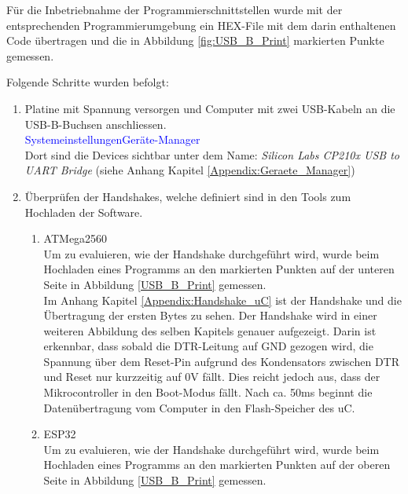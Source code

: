 
Für die Inbetriebnahme der Programmierschnittstellen wurde mit der entsprechenden Programmierumgebung ein HEX-File mit dem darin enthaltenen Code übertragen und die in Abbildung \ref{fig:USB_B_Print} markierten Punkte gemessen.

Folgende Schritte wurden befolgt:

\begin{enumerate}
\item Platine mit Spannung versorgen und Computer mit zwei USB-Kabeln an die USB-B-Buchsen anschliessen.\\
\textcolor{blue}{Systemeinstellungen\textrightarrow Geräte-Manager}\\
Dort sind die Devices sichtbar unter dem Name: \textit{Silicon Labs CP210x USB to UART Bridge} (siehe Anhang Kapitel \ref{Appendix:Geraete_Manager})\newline
\item Überprüfen der Handshakes, welche definiert sind in den Tools zum Hochladen der Software.\\

\begin{enumerate}
\item ATMega2560\\

Um zu evaluieren, wie der Handshake durchgeführt wird, wurde beim Hochladen eines Programms an den markierten Punkten auf der unteren Seite in Abbildung \ref{USB_B_Print} gemessen.\\

Im Anhang Kapitel \ref{Appendix:Handshake_uC} ist der Handshake und die Übertragung der ersten Bytes zu sehen. Der Handshake wird in einer weiteren Abbildung des selben Kapitels genauer aufgezeigt. Darin ist erkennbar, dass sobald die DTR-Leitung auf GND gezogen wird, die Spannung über dem Reset-Pin aufgrund des Kondensators zwischen DTR und Reset nur kurzzeitig auf 0V fällt. Dies reicht jedoch aus, dass der Mikrocontroller in den Boot-Modus fällt. Nach ca. 50ms beginnt die Datenübertragung vom Computer in den Flash-Speicher des uC.\\

\item ESP32\\

Um zu evaluieren, wie der Handshake durchgeführt wird, wurde beim Hochladen eines Programms an den markierten Punkten auf der oberen Seite in Abbildung \ref{USB_B_Print} gemessen.\\


\end{enumerate}
\end{enumerate}
